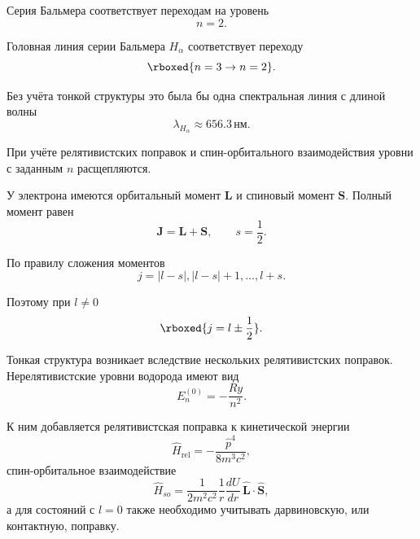 \documentclass[../final.tex]{subfiles}
\begin{document}

Серия Бальмера соответствует переходам на уровень
%
\begin{equation*}
    n=2.
\end{equation*}

Головная линия серии Бальмера $H_\alpha$ соответствует переходу
%
\begin{equation*}
    \rboxed{
        n=3\rightarrow n=2
    }.
\end{equation*}

Без учёта тонкой структуры это была бы одна спектральная линия
с длиной волны
%
\begin{equation*}
    \lambda_{H_\alpha}
    \approx
    656.3\,\text{нм}.
\end{equation*}

При учёте релятивистских поправок и спин-орбитального
взаимодействия уровни с заданным $n$ расщепляются.



У электрона имеются орбитальный момент $\mathbf L$ и спиновый
момент $\mathbf S$. Полный момент равен
%
\begin{equation*}
    \mathbf J
    =
    \mathbf L
    +
    \mathbf S,
    \qquad
    s=\frac12.
\end{equation*}

По правилу сложения моментов
%
\begin{equation*}
    j
    =
    |l-s|,
    |l-s|+1,
    \ldots,
    l+s.
\end{equation*}

Поэтому при $l\neq0$
%
\begin{equation*}
    \rboxed{
        j
        =
        l\pm\frac12
    }.
\end{equation*}

Тонкая структура возникает вследствие нескольких релятивистских
поправок. Нерелятивистские уровни водорода имеют вид
%
\begin{equation*}
    E_n^{(0)}
    =
    -\frac{Ry}{n^2}.
\end{equation*}

К ним добавляется релятивистская поправка к кинетической энергии
%
\begin{equation*}
    \hat H_{\text{rel}}
    =
    -\frac{\hat p^4}{8m^3c^2},
\end{equation*}
%
спин-орбитальное взаимодействие
%
\begin{equation*}
    \hat H_{so}
    =
    \frac{1}{2m^2c^2}
    \frac{1}{r}
    \frac{dU}{dr}
    \,
    \hat{\mathbf L}\cdot\hat{\mathbf S},
\end{equation*}
%
а для состояний с $l=0$ также необходимо учитывать
дарвиновскую, или контактную, поправку.
\end{document}
